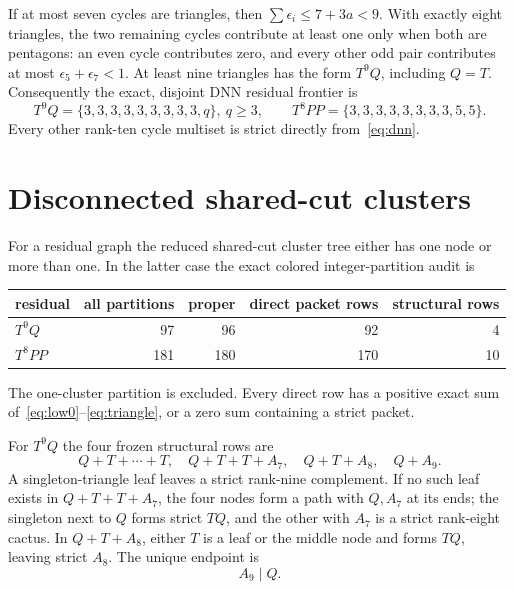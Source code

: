 \documentclass[11pt]{article}
\begin{document}
If at most seven cycles are triangles, then
$\sum\epsilon_i\leq7+3a<9$.  With exactly eight triangles, the two remaining
cycles contribute at least one only when both are pentagons: an even cycle
contributes zero, and every other odd pair contributes at most
$\epsilon_5+\epsilon_7<1$.  At least nine triangles has the form $T^9Q$,
including $Q=T$.  Consequently the exact, disjoint DNN residual frontier is
\begin{equation}\label{eq:residuals}
 T^9Q=\{3,3,3,3,3,3,3,3,3,q\},\ q\geq3,
 \qquad T^8PP=\{3,3,3,3,3,3,3,3,5,5\}.
\end{equation}
Every other rank-ten cycle multiset is strict directly from~\eqref{eq:dnn}.

\section{Disconnected shared-cut clusters}

For a residual graph the reduced shared-cut cluster tree either has one node
or more than one.  In the latter case the exact colored integer-partition audit
\cite{PartitionCode} is
\begin{center}
\begin{tabular}{lrrrr}
\toprule
residual&all partitions&proper&direct packet rows&structural rows\\
\midrule
$T^9Q$&97&96&92&4\\
$T^8PP$&181&180&170&10\\
\bottomrule
\end{tabular}
\end{center}
The one-cluster partition is excluded.  Every direct row has a positive exact
sum of~\eqref{eq:low0}--\eqref{eq:triangle}, or a zero sum containing a strict
packet.

For $T^9Q$ the four frozen structural rows are
\[
 Q+T+\cdots+T,\quad Q+T+T+A_7,\quad Q+T+A_8,
 \quad Q+A_9.
\]
A singleton-triangle leaf leaves a strict rank-nine complement.  If no such
leaf exists in $Q+T+T+A_7$, the four nodes form a path with $Q,A_7$ at its
ends; the singleton next to $Q$ forms strict $TQ$, and the other with $A_7$
is a strict rank-eight cactus.  In $Q+T+A_8$, either $T$ is a leaf or the
middle node and forms $TQ$, leaving strict $A_8$.  The unique endpoint is
\begin{equation}\label{eq:dq} A_9\mid Q.\end{equation}
\end{document}
